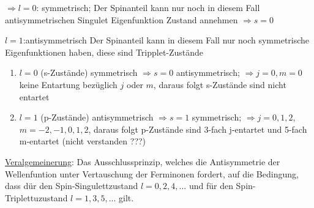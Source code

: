 \documentclass[10pt,a4paper,oneside,fleqn]{scrbook}
\begin{document}
\(\Rightarrow l=0\): symmetrisch;
Der Spinanteil kann nur noch in diesem Fall antisymmetrischen Singulet Eigenfunktion Zustand annehmen \(\Rightarrow s=0\) 


 \(l=1\):antisymmetrisch
Der Spinanteil kann in diesem Fall nur noch symmetrische Eigenfunktionen haben, diese sind Tripplet-Zustände


\begin{enumerate}
\item \(l=0\) (s-Zustände) symmetrisch
 \(\Rightarrow s=0\) antisymmetrisch;
 \(\Rightarrow j=0,m=0\) keine Entartung bezüglich \(j\) oder \(m\), daraus folgt s-Zustände sind nicht entartet
\item \(l=1\) (p-Zustände) antisymmetrisch
 \(\Rightarrow s=1\) symmetrisch;
 \(\Rightarrow j=0,1,2\), \(m=-2,-1,0,1,2\), daraus folgt p-Zustände sind 3-fach j-entartet und 5-fach m-entartet (nicht verstanden ???)
\end{enumerate}

\underline{Veralgemeinerung}: Das Ausschlussprinzip, welches die Antisymmetrie der Wellenfuntion unter Vertauschung der Ferminonen fordert, auf die Bedingung, dass dür den Spin-Singulettzustand \(l=0,2,4,...\) und für den Spin-Triplettuzustand \(l=1,3,5,...\) gilt.
\end{document}
